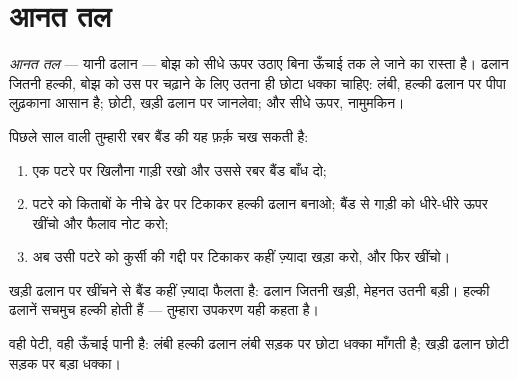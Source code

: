 \section{आनत तल}

\begin{definition}[आनत तल]\label{def:g5:simple-machines:ramp}
\emph{आनत तल} --- यानी ढलान --- बोझ को सीधे ऊपर उठाए
बिना ऊँचाई तक ले जाने का रास्ता है। ढलान जितनी हल्की, बोझ को उस पर
चढ़ाने के लिए उतना ही छोटा धक्का चाहिए: लंबी, हल्की ढलान पर पीपा
लुढ़काना आसान है; छोटी, खड़ी ढलान पर जानलेवा; और सीधे ऊपर, नामुमकिन।
\end{definition}

\begin{method}\label{met:g5:simple-machines:measure}
पिछले साल वाली तुम्हारी रबर बैंड की  यह फ़र्क़ चख सकती है:
\begin{enumerate}
  \item एक पटरे पर खिलौना गाड़ी रखो और उससे रबर बैंड बाँध दो;
  \item पटरे को किताबों के नीचे ढेर पर टिकाकर हल्की ढलान बनाओ; बैंड
        से गाड़ी को धीरे-धीरे ऊपर खींचो और फैलाव नोट करो;
  \item अब उसी पटरे को कुर्सी की गद्दी पर टिकाकर कहीं ज़्यादा खड़ा
        करो, और फिर खींचो।
\end{enumerate}
खड़ी ढलान पर खींचने से बैंड कहीं ज़्यादा फैलता है: ढलान जितनी खड़ी,
मेहनत उतनी बड़ी। हल्की ढलानें सचमुच हल्की होती हैं --- तुम्हारा उपकरण
यही कहता है।
\end{method}

\begin{omfigure}

{\small वही पेटी, वही ऊँचाई पानी है: लंबी हल्की ढलान लंबी सड़क पर
छोटा धक्का माँगती है; खड़ी ढलान छोटी सड़क पर बड़ा धक्का।}
\end{omfigure}


